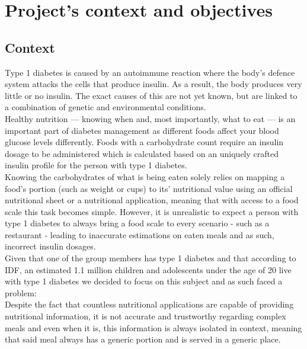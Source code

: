 \chapter{Project's context and objectives}

\section{Context}

Type 1 diabetes is caused by an autoimmune reaction where the body’s defence system attacks the cells that produce insulin. 
As a result, the body produces very little or no insulin. 
The exact causes of this are not yet known, but are linked to a combination of genetic and environmental conditions.
\cite{idf}\\

Healthy nutrition — knowing when and, most importantly, what to eat — is an important part of 
diabetes management as different foods affect your blood glucose levels differently. Foods with a 
carbohydrate count require an insulin dosage to be administered which is calculated based 
on an uniquely crafted insulin profile for the person with type 1 diabetes.\\

Knowing the carbohydrates of what is being eaten solely relies on mapping a food's portion (such as weight or cups) to its' nutritional 
value using an official nutritional sheet \cite{mellitus} or a nutritional application, 
meaning that with access to a food scale this task becomes simple. However, it is unrealistic to expect a person with type 1 diabetes
to always bring a food scale to every scenario - such as a restaurant - leading to inaccurate estimations on eaten meals and as such,
incorrect insulin dosages.\\

Given that one of the group members has type 1 diabetes and that according to IDF, an estimated 1.1 million children and adolescents under the age of 20 
live with type 1 diabetes \cite{idfatlas} we decided to focus on this subject
and as such faced a problem:\\ 

Despite the fact that countless nutritional applications are capable of providing nutritional information, it is not  
accurate and trustworthy regarding complex meals and even when it is, this information is always isolated in context, 
meaning that said meal always has a generic portion and is served in a generic place.\\

